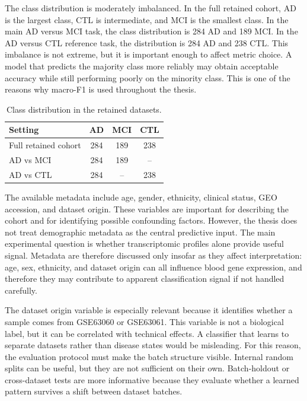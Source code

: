 The class distribution is moderately imbalanced. In the full retained cohort, AD is the largest class, CTL is intermediate, and MCI is the smallest class. In the main AD versus MCI task, the class distribution is 284 AD and 189 MCI. In the AD versus CTL reference task, the distribution is 284 AD and 238 CTL. This imbalance is not extreme, but it is important enough to affect metric choice. A model that predicts the majority class more reliably may obtain acceptable accuracy while still performing poorly on the minority class. This is one of the reasons why macro-F1 is used throughout the thesis.

\begin{table}[htbp]
\centering
\caption{Class distribution in the retained datasets.}
\label{tab:class-distribution}
\begin{tabular}{lccc}
\hline
Setting & AD & MCI & CTL \\
\hline
Full retained cohort & 284 & 189 & 238 \\
AD vs MCI & 284 & 189 & -- \\
AD vs CTL & 284 & -- & 238 \\
\hline
\end{tabular}
\end{table}

The available metadata include age, gender, ethnicity, clinical status, GEO accession, and dataset origin. These variables are important for describing the cohort and for identifying possible confounding factors. However, the thesis does not treat demographic metadata as the central predictive input. The main experimental question is whether transcriptomic profiles alone provide useful signal. Metadata are therefore discussed only insofar as they affect interpretation: age, sex, ethnicity, and dataset origin can all influence blood gene expression, and therefore they may contribute to apparent classification signal if not handled carefully.

The dataset origin variable is especially relevant because it identifies whether a sample comes from GSE63060 or GSE63061. This variable is not a biological label, but it can be correlated with technical effects. A classifier that learns to separate datasets rather than disease states would be misleading. For this reason, the evaluation protocol must make the batch structure visible. Internal random splits can be useful, but they are not sufficient on their own. Batch-holdout or cross-dataset tests are more informative because they evaluate whether a learned pattern survives a shift between dataset batches.

